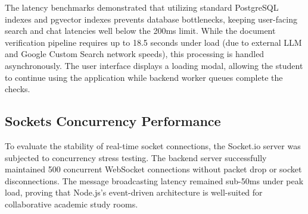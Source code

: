 \documentclass[12,Times new Roman,a4paper]{report}
\renewcommand{\arraystretch}{1.5} %
\begin{document}
\begin{table}[htbp]
\centering
\renewcommand{\arraystretch}{1.5}
\caption{System Latency Benchmarks under Concurrent Loads}
\label{tab:latency_benchmarks}
\end{table}

The latency benchmarks demonstrated that utilizing standard PostgreSQL indexes and pgvector indexes prevents database bottlenecks, keeping user-facing search and chat latencies well below the 200ms limit. While the document verification pipeline requires up to 18.5 seconds under load (due to external LLM and Google Custom Search network speeds), this processing is handled asynchronously. The user interface displays a loading modal, allowing the student to continue using the application while backend worker queues complete the checks.

\subsection{Sockets Concurrency Performance}
To evaluate the stability of real-time socket connections, the Socket.io server was subjected to concurrency stress testing. The backend server successfully maintained 500 concurrent WebSocket connections without packet drop or socket disconnections. The message broadcasting latency remained sub-50ms under peak load, proving that Node.js's event-driven architecture is well-suited for collaborative academic study rooms.
\end{document}
